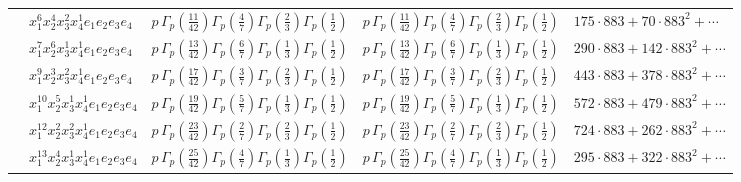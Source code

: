 \documentclass[11pt]{article}
\begin{document}
\begin{table}[ht]
{\begin{tabular}{@{}lllll@{}}
 & $x_{1}^{6} x_{2}^{4} x_{3}^{2} x_{4}^{1}  e_{1} e_{2} e_{3} e_{4}$ & $p \, \Gamma_p \left( \frac{11}{42} \right) \Gamma_p \left( \frac{4}{7} \right) \Gamma_p \left( \frac{2}{3} \right) \Gamma_p \left( \frac{1}{2} \right)$ & $p \, \Gamma_p \left( \frac{11}{42} \right) \Gamma_p \left( \frac{4}{7} \right) \Gamma_p \left( \frac{2}{3} \right) \Gamma_p \left( \frac{1}{2} \right)$ & $175{\cdot}883{+}70{\cdot}883^{2}{+}\cdots$ \\
 & $x_{1}^{7} x_{2}^{6} x_{3}^{1} x_{4}^{1}  e_{1} e_{2} e_{3} e_{4}$ & $p \, \Gamma_p \left( \frac{13}{42} \right) \Gamma_p \left( \frac{6}{7} \right) \Gamma_p \left( \frac{1}{3} \right) \Gamma_p \left( \frac{1}{2} \right)$ & $p \, \Gamma_p \left( \frac{13}{42} \right) \Gamma_p \left( \frac{6}{7} \right) \Gamma_p \left( \frac{1}{3} \right) \Gamma_p \left( \frac{1}{2} \right)$ & $290{\cdot}883{+}142{\cdot}883^{2}{+}\cdots$ \\
 & $x_{1}^{9} x_{2}^{3} x_{3}^{2} x_{4}^{1}  e_{1} e_{2} e_{3} e_{4}$ & $p \, \Gamma_p \left( \frac{17}{42} \right) \Gamma_p \left( \frac{3}{7} \right) \Gamma_p \left( \frac{2}{3} \right) \Gamma_p \left( \frac{1}{2} \right)$ & $p \, \Gamma_p \left( \frac{17}{42} \right) \Gamma_p \left( \frac{3}{7} \right) \Gamma_p \left( \frac{2}{3} \right) \Gamma_p \left( \frac{1}{2} \right)$ & $443{\cdot}883{+}378{\cdot}883^{2}{+}\cdots$ \\
 & $x_{1}^{10} x_{2}^{5} x_{3}^{1} x_{4}^{1}  e_{1} e_{2} e_{3} e_{4}$ & $p \, \Gamma_p \left( \frac{19}{42} \right) \Gamma_p \left( \frac{5}{7} \right) \Gamma_p \left( \frac{1}{3} \right) \Gamma_p \left( \frac{1}{2} \right)$ & $p \, \Gamma_p \left( \frac{19}{42} \right) \Gamma_p \left( \frac{5}{7} \right) \Gamma_p \left( \frac{1}{3} \right) \Gamma_p \left( \frac{1}{2} \right)$ & $572{\cdot}883{+}479{\cdot}883^{2}{+}\cdots$ \\
 & $x_{1}^{12} x_{2}^{2} x_{3}^{2} x_{4}^{1}  e_{1} e_{2} e_{3} e_{4}$ & $p \, \Gamma_p \left( \frac{23}{42} \right) \Gamma_p \left( \frac{2}{7} \right) \Gamma_p \left( \frac{2}{3} \right) \Gamma_p \left( \frac{1}{2} \right)$ & $p \, \Gamma_p \left( \frac{23}{42} \right) \Gamma_p \left( \frac{2}{7} \right) \Gamma_p \left( \frac{2}{3} \right) \Gamma_p \left( \frac{1}{2} \right)$ & $724{\cdot}883{+}262{\cdot}883^{2}{+}\cdots$ \\
 & $x_{1}^{13} x_{2}^{4} x_{3}^{1} x_{4}^{1}  e_{1} e_{2} e_{3} e_{4}$ & $p \, \Gamma_p \left( \frac{25}{42} \right) \Gamma_p \left( \frac{4}{7} \right) \Gamma_p \left( \frac{1}{3} \right) \Gamma_p \left( \frac{1}{2} \right)$ & $p \, \Gamma_p \left( \frac{25}{42} \right) \Gamma_p \left( \frac{4}{7} \right) \Gamma_p \left( \frac{1}{3} \right) \Gamma_p \left( \frac{1}{2} \right)$ & $295{\cdot}883{+}322{\cdot}883^{2}{+}\cdots$ \\

\end{tabular}}
\end{table}
\end{document}
